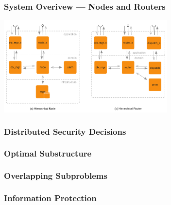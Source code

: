 \documentclass[t,handout, 10pt]{beamer}
\begin{document}
\begin{frame}
\frametitle{System Overivew --- Nodes and Routers}
\centerline{\includegraphics[width=3.5in]{router-node-view}}
\end{frame}

\begin{frame}
\frametitle{Distributed Security Decisions}
\end{frame}

\begin{frame}
\frametitle{Optimal Substructure}
\end{frame}

\begin{frame}
\frametitle{Overlapping Subproblems}
\end{frame}

\begin{frame}
\frametitle{Information Protection}
\end{frame}

\begin{frame}
\frametitle{}
\end{frame}
\end{document}
